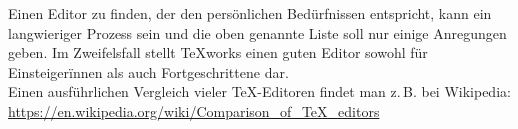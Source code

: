 \documentclass[
	ausgabe=2024-02-12,
	titel=Installationshinweise,
	shortverb=true,
]{../tex/latexkurs-exercise}
\begin{document}
\noindent Einen Editor zu finden, der den persönlichen Bedürfnissen entspricht, kann ein langwieriger Prozess sein und die oben genannte Liste soll nur einige Anregungen geben. Im Zweifelsfall stellt \TeX works  einen guten Editor sowohl für Einsteigerïnnen als auch Fortgeschrittene dar.\\Einen ausführlichen Vergleich vieler \TeX-Editoren findet man z.\,B. bei Wikipedia:\\ \url{https://en.wikipedia.org/wiki/Comparison_of_TeX_editors}

\end{document}
